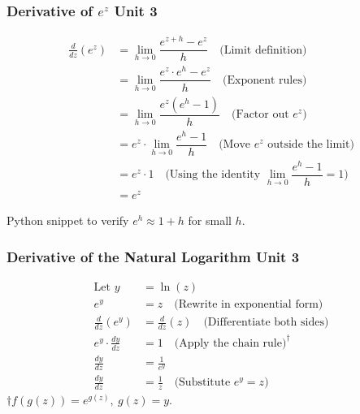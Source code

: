 \documentclass[12pt]{beamer}
\newcommand{\FrameTitle}[2]{\frametitle{#1 \hfill \small\textnormal{\textcolor{midgray}{#2}}}}
\begin{document}
\begin{frame}\FrameTitle{Derivative of $e^z$}{Unit 3}
    \begin{align*}
        \frac{d}{dz}(e^z) &= \lim_{h \to 0} \dfrac{e^{z+h} - e^z}{h} \quad \text{(Limit definition)} \\[2pt]
        &= \lim_{h \to 0} \dfrac{e^z \cdot e^h - e^z}{h} \quad \text{(Exponent rules)} \\[2pt]
        &= \lim_{h \to 0} \dfrac{e^z(e^h - 1)}{h} \quad \text{(Factor out } e^z\text{)} \\[2pt]
        &= e^z \cdot \lim_{h \to 0} \dfrac{e^h - 1}{h} \quad \text{(Move } e^z \text{ outside the limit)} \\[2pt]
        &= e^z \cdot 1 \quad \text{(Using the identity } \lim_{h \to 0} \dfrac{e^h-1}{h} = 1\text{)} \\[2pt]
        &= e^z
    \end{align*}

    \vfill
    {\scriptsize\color{question}Python snippet to verify $e^h \approx 1 + h$ for small $h$.}
\end{frame}

\begin{frame}\FrameTitle{Derivative of the Natural Logarithm}{Unit 3}
    \begin{align*}
        \text{Let } y &= \ln(z) \\
            e^y &= z \quad \text{(Rewrite in exponential form)} \\[3pt]
            \frac{d}{dz}(e^y) &= \frac{d}{dz}(z) \quad \text{(Differentiate both sides)} \\[3pt]
            e^y \cdot \frac{dy}{dz} &= 1 \quad \text{(Apply the chain rule)}^{\dag} \\[3pt]
            \frac{dy}{dz} &= \frac{1}{e^y} \\[3pt]
            \frac{dy}{dz} &= \frac{1}{z} \quad \text{(Substitute } e^y = z \text{)}
    \end{align*}
    \vfill
    $\dag${\scriptsize\color{question}$f(g(z)) = e^{g(z)}, \ g(z) = y$.}
\end{frame}
\end{document}
